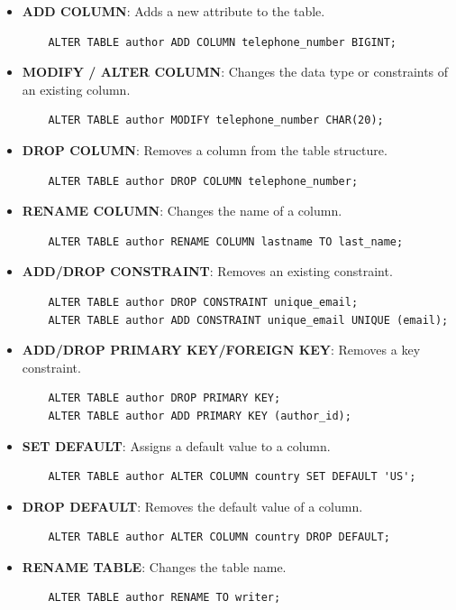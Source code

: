 \documentclass{article}
\begin{document}
\begin{itemize}

    \item \textbf{ADD COLUMN}: Adds a new attribute to the table.
    \begin{verbatim}
    ALTER TABLE author ADD COLUMN telephone_number BIGINT;
    \end{verbatim}

    \item \textbf{MODIFY / ALTER COLUMN}: Changes the data type or constraints of an existing column.
    \begin{verbatim}
    ALTER TABLE author MODIFY telephone_number CHAR(20);
    \end{verbatim}

    \item \textbf{DROP COLUMN}: Removes a column from the table structure.
    \begin{verbatim}
    ALTER TABLE author DROP COLUMN telephone_number;
    \end{verbatim}

    \item \textbf{RENAME COLUMN}: Changes the name of a column.
    \begin{verbatim}
    ALTER TABLE author RENAME COLUMN lastname TO last_name;
    \end{verbatim}

    \item \textbf{ADD/DROP CONSTRAINT}: Removes an existing constraint.
    \begin{verbatim}
    ALTER TABLE author DROP CONSTRAINT unique_email;
    ALTER TABLE author ADD CONSTRAINT unique_email UNIQUE (email);
    \end{verbatim}


    \item \textbf{ADD/DROP PRIMARY KEY/FOREIGN KEY}: Removes a key constraint.
    \begin{verbatim}
    ALTER TABLE author DROP PRIMARY KEY;
    ALTER TABLE author ADD PRIMARY KEY (author_id);
    \end{verbatim}

    \item \textbf{SET DEFAULT}: Assigns a default value to a column.
    \begin{verbatim}
    ALTER TABLE author ALTER COLUMN country SET DEFAULT 'US';
    \end{verbatim}

    \item \textbf{DROP DEFAULT}: Removes the default value of a column.
    \begin{verbatim}
    ALTER TABLE author ALTER COLUMN country DROP DEFAULT;
    \end{verbatim}

    \item \textbf{RENAME TABLE}: Changes the table name.
    \begin{verbatim}
    ALTER TABLE author RENAME TO writer;
    \end{verbatim}

\end{itemize}
\end{document}
